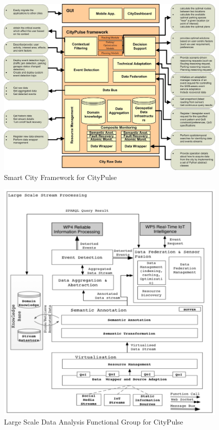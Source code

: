 \documentclass[]{scrartcl}
\begin{document}
\begin{figure}[h]
	\centering
	\includegraphics[width=\textwidth]{Tsiatsis_2015b}
	\caption{Smart City Framework for CityPulse~\cite[p.~39]{Tsiatsis.2015}}
	\label{fig:rasca-impl}
\end{figure}

\begin{figure}[h]
	\centering
	\includegraphics[width=\textwidth]{Tsiatsis_2015}
	\caption{Large Scale Data Analysis Functional Group for CityPulse~\cite[p.~25]{Tsiatsis.2015}}
	\label{fig:citypulse-streaming}
\end{figure}
\end{document}
